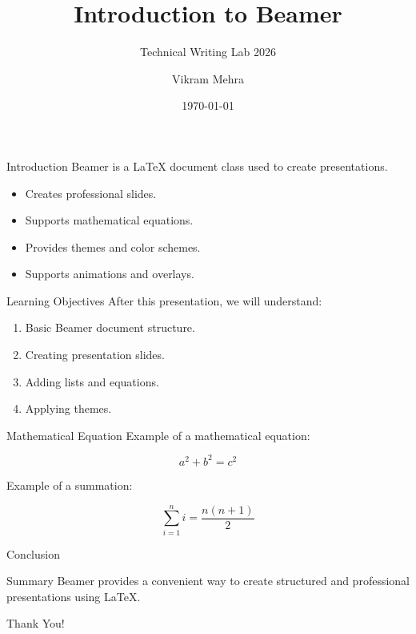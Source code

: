 \documentclass{beamer}
\title{Introduction to Beamer}
\subtitle{Technical Writing Lab 2026}
\author{Vikram Mehra}
\institute{Department of Computer Science}
\date{\today}
\begin{document}
\begin{frame}
    \titlepage
\end{frame}

\begin{frame}{Introduction}
    Beamer is a LaTeX document class used to create presentations.

    \begin{itemize}
        \item Creates professional slides.
        \item Supports mathematical equations.
        \item Provides themes and color schemes.
        \item Supports animations and overlays.
    \end{itemize}
\end{frame}

\begin{frame}{Learning Objectives}
    After this presentation, we will understand:
    \begin{enumerate}
        \item Basic Beamer document structure.
        \item Creating presentation slides.
        \item Adding lists and equations.
        \item Applying themes.
    \end{enumerate}
\end{frame}

\begin{frame}{Mathematical Equation}
    Example of a mathematical equation:

    \[
        a^2 + b^2 = c^2
    \]

    Example of a summation:

    \[
        \sum_{i=1}^{n} i = \frac{n(n+1)}{2}
    \]
\end{frame}

\begin{frame}{Conclusion}
    \begin{block}{Summary}
        Beamer provides a convenient way to create structured
        and professional presentations using LaTeX.
    \end{block}
    \centering
    Thank You!
\end{frame}
\end{document}
